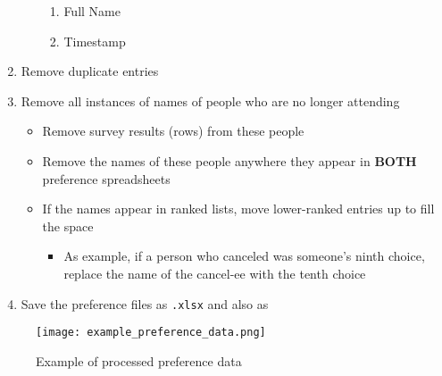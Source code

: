 \begin{enumerate}
\begin{itemize}
				\begin{enumerate}
					\item Full Name
					\item Timestamp
				\end{enumerate}
		\end{itemize}
	\item Remove duplicate entries
	\item Remove all instances of names of people who are no longer attending
		\begin{itemize}
			\item Remove survey results (rows) from these people
			\item Remove the names of these people anywhere they appear in \textbf{BOTH} preference spreadsheets
			\item If the names appear in ranked lists, move lower-ranked entries up to fill the space
				\begin{itemize}
					\item As example, if a person who canceled was someone's ninth choice, replace the name of the cancel-ee with the tenth choice
				\end{itemize}
		\end{itemize}
	\item Save the preference files as \texttt{.xlsx} and also as 
			
	
			
			
\end{enumerate}


\begin{figure}
	\centering
	\texttt{[image: example\_preference\_data.png]}
	\caption{\label{fig:example_preference_data} Example of processed preference data}
\end{figure}

